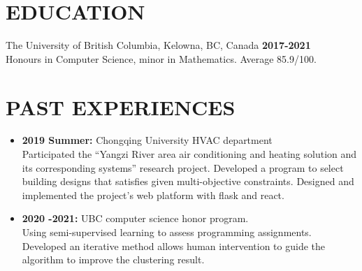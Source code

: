 \documentclass{res}
\begin{document}

\address{\textbf{Email:} jimmy123good@hotmail.com \\
        \textbf{Github: }https://github.com/ailrk \\
         \textbf{Blog:}    https://ailrk.github.io/home \\
         \textbf{Contact:}  +1 (250) 899 2600}
\begin{resume}

\section{EDUCATION}
The University of British Columbia, Kelowna, BC, Canada  \hspace{1.2in} \textbf{2017-2021}\\
    Honours in Computer Science, minor in Mathematics. Average 85.9/100. \\

\vspace{-0.2in}
\section{PAST EXPERIENCES}
\begin{itemize}[leftmargin=-.1in]
    \item \textbf{2019 Summer:} Chongqing University HVAC department
        \vspace{0.05in}\\ Participated the ``Yangzi River area air conditioning and heating solution and its corresponding systems'' research project. Developed a program to select building designs that satisfies given multi-objective constraints.
     Designed and implemented the project's web platform with flask and react. \\
    \item \textbf{2020 -2021: } UBC computer science honor program. \\
        \vspace{0.05in} Using semi-supervised learning to assess programming assignments. Developed an iterative method allows human intervention to guide the algorithm to improve the clustering result. \\


\end{itemize}

\vspace{-0.2in}

\end{resume}
\end{document}
